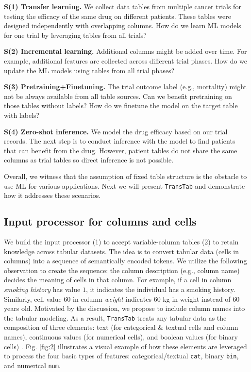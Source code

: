 \textbf{S(1) Transfer learning.} We collect data tables from multiple cancer trials for testing the efficacy of the same drug on different patients. These tables were designed independently with overlapping columns. How do we learn ML models for one trial by leveraging tables from all trials?

\textbf{S(2) Incremental learning.} Additional columns might be added over time. For example, additional features are collected across different trial phases. How do we update the ML models using tables from all trial phases?

\textbf{S(3) Pretraining+Finetuning.} The trial outcome label (e.g., mortality) might not be always available from all table sources. Can we benefit pretraining on those tables without labels? How do we finetune the model on the target table with labels?

\textbf{S(4) Zero-shot inference.} We model the drug efficacy based on our trial records. The next step is to conduct inference with the model to find patients that can benefit from the drug. However, patient tables do not share the same columns as  trial tables so direct inference is not possible.

Overall, we witness that the assumption of fixed table structure is the obstacle to use ML for various applications. Next we will present \texttt{TransTab} and demonstrate how it addresses these scenarios.

\subsection{Input processor for columns and cells} \label{sec:processor}
We build the input processor (1) to accept variable-column tables (2) to retain knowledge across tabular datasets. The idea is to convert tabular data (cells in columns) into a sequence of semantically encoded tokens. We utilize the following observation to create the sequence: the column description (e.g., column name) decides the meaning of cells in that column. For example, if a cell in  column \textit{smoking history} has value $1$, it indicates the individual has a smoking history. Similarly, cell value $60$ in column  \textit{weight} indicates 60 kg in weight instead of 60 years old. Motivated by the discussion, we propose to include column names into the tabular modeling. As a result, \texttt{TransTab} treats any tabular data as the composition of three elements: text (for categorical \& textual cells and column names),  continuous values (for numerical cells), and boolean values (for binary cells) . Fig. \ref{fig:2} illustrates a visual example of how these elements are leveraged to process the four basic types of features: categorical/textual \texttt{cat}, binary \texttt{bin}, and numerical \texttt{num}. 

